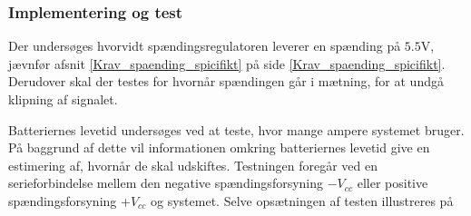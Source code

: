 \subsubsection{Implementering og test}
Der undersøges hvorvidt spændingsregulatoren leverer en spænding på $5.5$V, jævnfør afsnit \ref{Krav_spaending_spicifikt} på side \ref{Krav_spaending_spicifikt}. Derudover skal der testes for hvornår spændingen går i mætning, for at undgå klipning af signalet.


Batteriernes levetid undersøges ved at teste, hvor mange ampere systemet bruger. På baggrund af dette vil informationen omkring batteriernes levetid give en estimering af, hvornår de skal udskiftes. Testningen foregår ved en serieforbindelse mellem den negative spændingsforsyning $-V_{cc}$ eller positive spændingsforsyning $+V_{cc}$ og systemet. Selve opsætningen af testen illustreres på %

